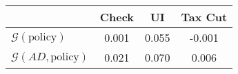\begin{tabular}{@{}lccc@{}} 
\toprule 
                          & Check      & UI    & Tax Cut    \\  \midrule 
$\mathcal{G}(\text{policy})$ & 0.001  & 0.055  & -0.001     \\ 
$\mathcal{G}(AD,\text{policy})$ & 0.021  & 0.070  & 0.006     \\ 
\end{tabular}  
